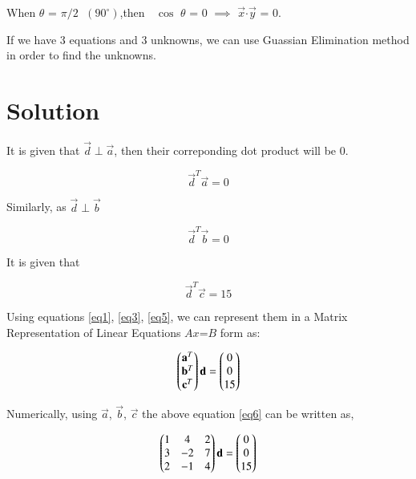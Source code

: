 \documentclass[journal,12pt,twocolumn]{IEEEtran}
\begin{document}
	When $\theta$ = $\pi/2$ $\;$$(90^\circ)$,then $\;$ $\cos$ $\theta$  = 0 $\implies$ $\vec{x}$$\cdot$$\vec{y}$ = 0.
	
	If we have 3 equations and 3 unknowns, we can use Guassian Elimination method in order to find the unknowns.
	
\section{\textbf{Solution}}

	It is given that $\vec{d}\perp\vec{a}$, then their correponding dot product will be 0.\hfill \break
	
	\begin{equation}\label{eq1}
		\vec{d}^{T}\vec{a} = 0
	\end{equation} 		

	Similarly, as $\vec{d}\perp\vec{b}$
 
	\begin{equation}\label{eq3}
		\vec{d}^{T}\vec{b} = 0 
	\end{equation}


	It is given that
	
	\begin{equation}\label{eq5}
		\vec{d}^{T}\vec{c} = 15 
	\end{equation}

	
    Using equations \ref{eq1}, \ref{eq3}, \ref{eq5}, we can represent them in a Matrix Representation of Linear Equations $A$$x$=$B$ form as:
 
    	\begin{align} \label{eq6}
    		\begin{pmatrix}
    			\mathbf{a}^{T} \\
    			\mathbf{b}^{T} \\
    			\mathbf{c}^{T} 
    		\end{pmatrix}
    		\mathbf{d}
    		=
    		\begin{pmatrix}
    			0 \\ 0 \\ 15
    		\end{pmatrix}
    	\end{align}
    	
    
     
Numerically, using $\vec{a}$, $\vec{b}$, $\vec{c}$ the above equation \ref{eq6} can be written as,

     
\begin{align}
	\begin{pmatrix}
		1 & 4 & 2 \\
		3 & -2 & 7 \\
		2 & -1 & 4 
	\end{pmatrix}
	\mathbf{d}
	=
	\begin{pmatrix}
		0 \\ 0 \\ 15
	\end{pmatrix}
\end{align}
\end{document}

